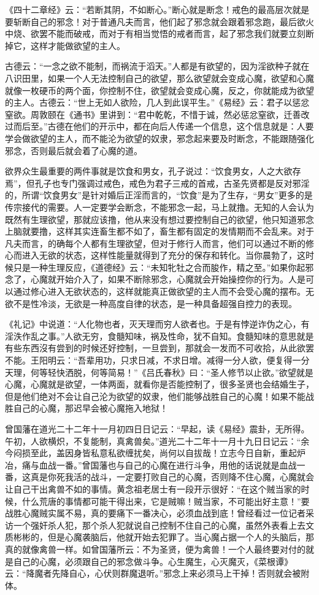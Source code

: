 《四十二章经》云：“若断其阴，不如断心。”断心就是断念！戒色的最高层次就是要斩断自己的邪念！对于普通凡夫而言，他们起了邪念就会跟着邪念跑，最后欲火中烧、欲罢不能而破戒，而对于有相当觉悟的戒者而言，起了邪念我们就要立刻断掉它，这样才能做欲望的主人。

古德云：“一念之欲不能制，而祸流于滔天。”人都是有欲望的，因为淫欲种子就在八识田里，如果一个人无法控制自己的欲望，那么欲望就会变成心魔，欲望和心魔就像一枚硬币的两个面，你控制不住，欲望就会变成心魔，反之，你就能成为欲望的主人。古德云：“世上无如人欲险，几人到此误平生。”《易经》云：君子以惩忿窒欲。周敦颐在《通书》里讲到：“君中乾乾，不惜于诚，然必惩忿窒欲，迁善改过而后至。”古德在他们的开示中，都在向后人传递一个信息，这个信息就是：人要学会做欲望的主人，而不能沦为欲望的奴隶，邪念起来要及时断念，不能跟随强化邪念，否则最后就会着了心魔的道。

欲界众生最重要的两件事就是饮食和男女，孔子说过：“饮食男女，人之大欲存焉”，但孔子也专门强调过戒色，戒色为君子三戒的首戒，古圣先贤都是反对邪淫的，所谓“饮食男女”是针对婚后正淫而言的，“饮食”是为了生存，“男女”更多的是传宗接代的需要。人一定要学会断念，不能邪念一起，马上就撸。无知的人会认为既然有生理欲望，那就应该撸，他从来没有想过要控制自己的欲望，他只知道邪念上脑就要撸，这样其实连畜生都不如了，畜生都有固定的发情期而不会乱来。对于凡夫而言，的确每个人都有生理欲望，但对于修行人而言，他们可以通过不断的修心而进入无欲的状态，这样性能量就得到了充分的保存和转化。当你晨勃了，这时候只是一种生理反应，《道德经》云：“未知牝牡之合而朘作，精之至。”如果你起邪念了，心魔就开始介入了，如果不断除邪念，心魔就会开始操控你的行为。人是可以通过修心进入无欲状态的，这样就能真正做欲望的主人而不会受心魔的摆布。无欲不是性冷淡，无欲是一种高度自律的状态，是一种具备超强自控力的表现。

《礼记》中说道：“人化物也者，灭天理而穷人欲者也。于是有悖逆诈伪之心，有淫泆作乱之事。”人欲无穷，食髓知味，祸及性命，犹不自知。食髓知味的意思就是有些东西沒有尝到的时候还好控制，一旦尝到，那就会一发而不可收拾，从此欲罢不能。王阳明云：“吾辈用功，只求日减，不求日增。减得一分人欲，便复得一分天理，何等轻快洒脱，何等简易！”《吕氏春秋》曰：“圣人修节以止欲。”欲望就是心魔，心魔就是欲望，一体两面，就看你是否能控制了，很多圣贤也会结婚生子，但是他们绝对不会让自己沦为欲望的奴隶，他们能够战胜自己的心魔！如果不能战胜自己的心魔，那迟早会被心魔拖入地狱！

曾国藩在道光二十二年十一月初四日日记云：“早起，读《易经》震卦，无所得。午初，人欲横炽，不复能制，真禽兽矣。”道光二十二年十一月十九日日记云：“余今闷损至此，盖因身皆私意私欲缠扰矣，尚何以自拔哉！立志今日自新，重起炉冶，痛与血战一番。”曾国藩也与自己的心魔在进行斗争，用他的话说就是血战一番，这真是你死我活的战斗，一定要打败自己的心魔，否则降不住心魔，心魔就会让自己干出禽兽不如的事情。黄念祖老居士有一段开示很好：“在这个贼当家的时候，什么荒唐的事情都可能干得出来，它是贼嘛！贼当家，不可能出好主意！”要战胜心魔贼实属不易，真的要痛下一番决心，必须血战到底！曾经看过一位记者采访一个强奸杀人犯，那个杀人犯就说自己控制不住自己的心魔，虽然外表看上去文质彬彬的，但是心魔袭脑后，他就开始去犯罪了。当心魔占据一个人的头脑后，那真的就像禽兽一样。如曾国藩所云：不为圣贤，便为禽兽！一个人最终要对付的就是自己的心魔，必须跟自己的邪念做斗争。心生魔生，心灭魔灭，《菜根谭》云：“降魔者先降自心，心伏则群魔退听。”邪念上来必须马上干掉！否则就会被附体。

